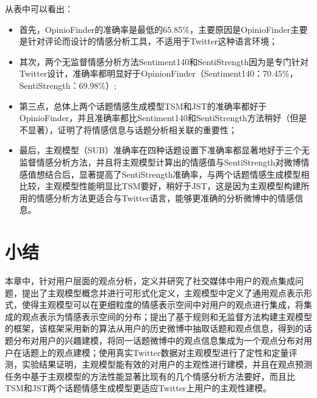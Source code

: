 从表中可以看出：
\begin{itemize}
\item 首先，OpinioFinder的准确率是最低的65.85\%，主要原因是OpinioFinder主要是针对评论而设计的情感分析工具，不适用于Twitter这种语言环境；
\item 其次，两个无监督情感分析方法Sentiment140和SentiStrength因为是专门针对Twitter设计，准确率都明显好于OpinionFinder（Sentiment140：70.45\%，SentiStrength：69.98\%）;
\item 第三点，总体上两个话题情感生成模型TSM和JST的准确率都好于OpinioFinder，并且准确率都比Sentiment140和SentiStrength方法稍好（但是不显著），证明了将情感信息与话题分析相关联的重要性；
\item 最后，主观模型（SUB）准确率在四种话题设置下准确率都显著地好于三个无监督情感分析方法，并且将主观模型计算出的情感值与SentiStrength对微博情感值想结合后，显著提高了SentiStrength准确率，与两个话题情感生成模型相比较，主观模型性能明显比TSM要好，稍好于JST，这是因为主观模型构建所用的情感分析方法更适合与Twitter语言，能够更准确的分析微博中的情感信息。
\end{itemize}

\section{小结}
\label{sec6}
本章中，针对用户层面的观点分析，定义并研究了社交媒体中用户的观点集成问题，提出了主观模型概念并进行可形式化定义，主观模型中定义了通用观点表示形式，使得主观模型可以在更细粒度的情感表示空间中对用户的观点进行集成，将集成的观点表示为情感表示空间的分布；提出了基于规则和无监督方法构建主观模型的框架，该框架采用新的算法从用户的历史微博中抽取话题和观点信息，得到的话题分布对用户的兴趣建模，将同一话题微博中的观点信息集成为一个观点分布对用户在话题上的观点建模；使用真实Twitter数据对主观模型进行了定性和定量评测，实验结果证明，主观模型能有效的对用户的主观性进行建模，并且在观点预测任务中基于主观模型的方法性能显著比现有的几个情感分析方法要好，而且比TSM和JST两个话题情感生成模型更适应Twitter上用户的主观性建模。
